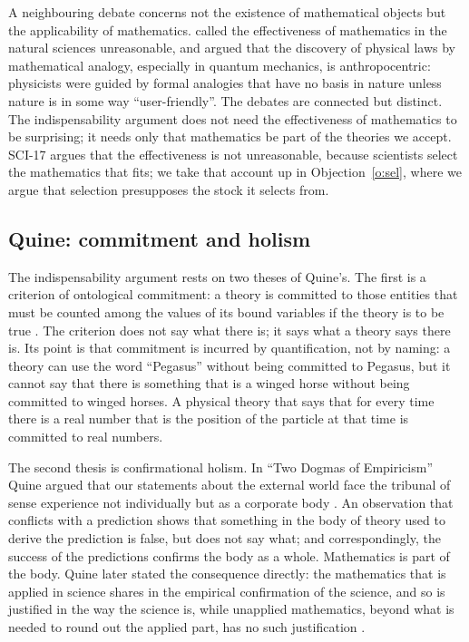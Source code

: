 \documentclass{situationist-preprint}
\begin{document}
A neighbouring debate concerns not the existence of mathematical objects but the applicability of mathematics. \citet{Wigner1960} called the effectiveness of mathematics in the natural sciences unreasonable, and \citet{Steiner1998} argued that the discovery of physical laws by mathematical analogy, especially in quantum mechanics, is anthropocentric: physicists were guided by formal analogies that have no basis in nature unless nature is in some way \enquote{user-friendly}. The debates are connected but distinct. The indispensability argument does not need the effectiveness of mathematics to be surprising; it needs only that mathematics be part of the theories we accept. SCI-17 argues that the effectiveness is not unreasonable, because scientists select the mathematics that fits; we take that account up in Objection~\ref{o:sel}, where we argue that selection presupposes the stock it selects from.

\subsection{Quine: commitment and holism}

The indispensability argument rests on two theses of Quine's. The first is a criterion of ontological commitment: a theory is committed to those entities that must be counted among the values of its bound variables if the theory is to be true \citep{Quine1948}. The criterion does not say what there is; it says what a theory says there is. Its point is that commitment is incurred by quantification, not by naming: a theory can use the word \enquote{Pegasus} without being committed to Pegasus, but it cannot say that there is something that is a winged horse without being committed to winged horses. A physical theory that says that for every time there is a real number that is the position of the particle at that time is committed to real numbers.

The second thesis is confirmational holism. In \enquote{Two Dogmas of Empiricism} Quine argued that our statements about the external world face the tribunal of sense experience not individually but as a corporate body \citep{Quine1951}. An observation that conflicts with a prediction shows that something in the body of theory used to derive the prediction is false, but does not say what; and correspondingly, the success of the predictions confirms the body as a whole. Mathematics is part of the body. Quine later stated the consequence directly: the mathematics that is applied in science shares in the empirical confirmation of the science, and so is justified in the way the science is, while unapplied mathematics, beyond what is needed to round out the applied part, has no such justification \citep{Quine1981,Quine1986}.
\end{document}
